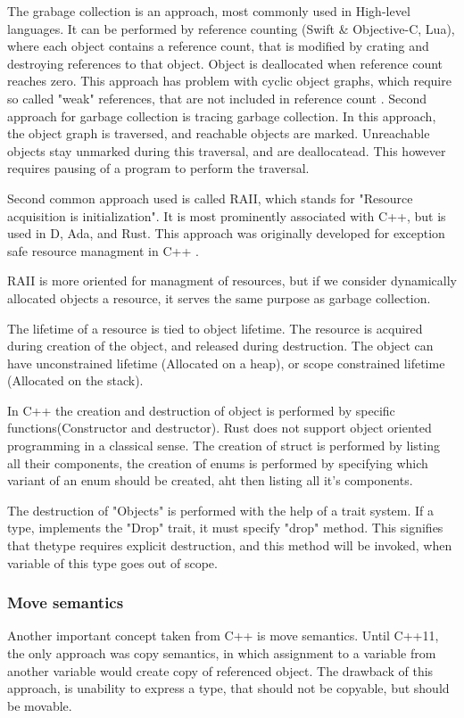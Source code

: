 The grabage collection is an approach, most commonly used in High-level languages. It can be performed
by reference counting (Swift \& Objective-C, Lua), where each object contains a reference count, that is modified
by crating and destroying references to that object. Object is deallocated when reference  count reaches zero.
This approach has problem with cyclic object graphs, which require so called "weak" references, that are
not included in reference count . Second approach for garbage collection is tracing garbage collection.
In this approach, the object graph is traversed, and reachable objects are marked. Unreachable objects stay unmarked during
this traversal, and are deallocatead. This however requires pausing of a program to perform the traversal.

Second common approach used is called RAII, which stands for "Resource acquisition is initialization". It is most
prominently associated with C++, but is used in D, Ada, and Rust. This approach was originally developed for exception safe
resource managment in C++ .

RAII is more oriented for managment of resources, but if we consider dynamically allocated objects a resource, it serves
the same purpose as garbage collection.

The lifetime of a resource is tied to object lifetime. The resource is acquired during creation of the object,
and released during destruction. The object can have unconstrained lifetime (Allocated on a heap), or scope constrained
lifetime (Allocated on the stack).

In C++ the creation and destruction of object is performed by specific functions(Constructor and destructor). Rust does
not support object oriented programming in a classical sense. The creation of struct is performed by listing all
their components, the creation of enums is performed by specifying which variant of an enum should be created, aht
then listing all it's components.

The destruction of "Objects" is performed with the help of a trait system. If a type, implements the "Drop" trait, it must
specify "drop" method. This signifies that thetype requires explicit destruction, and this method will
be invoked, when variable of this type goes out of scope.

\subsubsection{Move semantics}
Another important concept taken from C++ is move semantics. Until C++11, the only approach was copy semantics, in which
assignment to a variable from another variable would create copy of referenced object.
The drawback of this approach, is unability to express a type, that should not be copyable, but should be movable.

